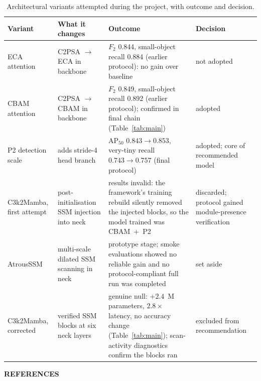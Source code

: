 \documentclass[12pt,a4paper,oneside]{report}
\begin{document}
\begin{table}[tbp]
  \centering
  \caption{Architectural variants attempted during the project, with outcome and decision.}
  \label{tab:apphistory}
  \small
  \setlength{\tabcolsep}{4pt}
  \begin{tabular}{@{}p{2.9cm} p{4.3cm} p{4.4cm} p{2.4cm}@{}}
    \toprule
    Variant & What it changes & Outcome & Decision \\
    \midrule
    ECA attention & C2PSA $\to$ ECA in backbone & $F_2$ 0.844, small-object recall 0.884 (earlier protocol): no gain over baseline & not adopted \\
    CBAM attention & C2PSA $\to$ CBAM in backbone & $F_2$ 0.849, small-object recall 0.892 (earlier protocol); confirmed in final chain (Table~\ref{tab:main}) & adopted \\
    P2 detection scale & adds stride-4 head branch & $\mathrm{AP}_{50}$ $0.843 \to 0.853$, very-tiny recall $0.743 \to 0.757$ (final protocol) & adopted; core of recommended model \\
    C3k2Mamba, first attempt & post-initialisation SSM injection into neck & results invalid: the framework's training rebuild silently removed the injected blocks, so the model trained was CBAM~+~P2 & discarded; protocol gained module-presence verification \\
    AtrousSSM & multi-scale dilated SSM scanning in neck & prototype stage; smoke evaluations showed no reliable gain and no protocol-compliant full run was completed & set aside \\
    C3k2Mamba, corrected & verified SSM blocks at six neck layers & genuine null: $+2.4$~M parameters, $2.8\times$ latency, no accuracy change (Table~\ref{tab:main}); scan-activity diagnostics confirm the blocks ran & excluded from recommendation \\
    \bottomrule
  \end{tabular}
\end{table}

\clearpage
{}
{}
\begin{center}{\fontsize{14}{21}\selectfont\bfseries REFERENCES}\end{center}
\printbibliography[heading=none]
\end{document}
